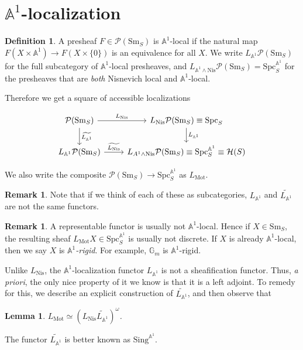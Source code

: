 \documentclass{shortart}
\newtheorem{lemma}[thm]{Lemma}
\theoremstyle{definition}
\newtheorem{defi}[thm]{Definition}
\newtheorem{remark}[thm]{Remark}
\newcommand\Sm{\mathrm{Sm}}
\newcommand\Spc{\mathrm{Spc}}
\newcommand\Sing{\mathrm{Sing}}
\newcommand\Nis{\mathrm{Nis}}
\newcommand\Pre{\mathcal{P}}
\renewcommand\H{\mathcal{H}}
\newcommand\A{\mathbb{A}}
\newcommand\G{\mathbb{G}}
\newcommand\Mot{\mathrm{Mot}}
\begin{document}
\section{\texorpdfstring{$\A^1$}{A1}-localization}
\begin{defi}
  A presheaf $F \in \Pre(\Sm_S)$ is $\A^1$-local if the natural map $F(X \times \A^1) \to F(X \times \{0\})$ is an equivalence for all $X$. We write $L_{\A^1}\Pre(\Sm_S)$ for the full subcategory of $\A^1$-local presheaves, and $L_{\A^1 \wedge \Nis}\Pre(\Sm_S) = \Spc_S^{\A^1}$ for the presheaves that are \emph{both} Nisnevich local and $\A^1$-local.
\end{defi}
Therefore we get a square of accessible localizations
\begin{useimager}
  \[
    \begin{tikzcd}
      \Pre(\Sm_S) \ar[r, "L_{\Nis}"] \ar[d, "\widetilde{L_{\A^1}}"] & L_{\Nis} \Pre(\Sm_S) \equiv \Spc_S \ar[d, "L_{\A^1}"]\\
      L_{\A^1} \Pre(\Sm_S) \ar[r, "\widetilde{L_{\Nis}}"] & L_{A^1 \wedge \Nis} \Pre(\Sm_S) \equiv \Spc_S^{\A^1} \equiv \H(S)
    \end{tikzcd}
  \]
\end{useimager}
We also write the composite $\Pre(\Sm_S) \to \Spc_S^{\A^1}$ as $L_{\Mot}$.

\begin{remark}
  Note that if we think of each of these as subcategories, $L_{\A^1}$ and $\widetilde{L_{\A^1}}$ are not the same functors.
\end{remark}

\begin{remark}
  A representable functor is usually not $\A^1$-local. Hence if $X \in \Sm_S$, the resulting sheaf $L_{\Mot} X \in \Spc_S^{\A^1}$ is usually not discrete. If $X$ is already $\A^1$-local, then we say $X$ is \emph{$\A^1$-rigid}. For example, $\G_m$ is $\A^1$-rigid.
\end{remark}
Unlike $L_{\Nis}$, the $\A^1$-localization functor $L_{\A^1}$ is not a sheafification functor. Thus, \emph{a priori}, the only nice property of it we know is that it is a left adjoint. To remedy for this, we describe an explicit construction of $\widetilde{L_{\A^1}}$, and then observe that
\begin{lemma}
  $L_{\Mot} \simeq (L_{\Nis} \widetilde{L_{\A^1}})^{\omega}$.
\end{lemma}

The functor $\widetilde{L_{\A^1}}$ is better known as $\Sing^{\A^1}$.
\end{document}
